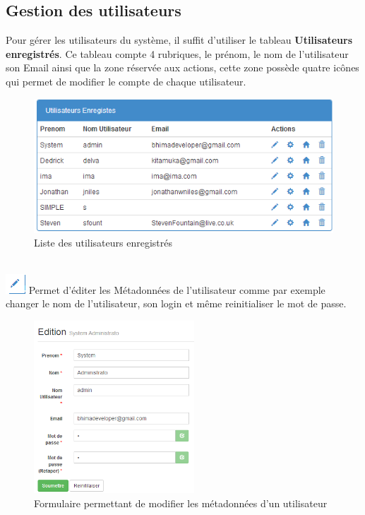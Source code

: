 \documentclass[12pt,a4paper]{report}
\begin{document}
\subsection{Gestion des utilisateurs}
Pour gérer les utilisateurs du système, il suffit d'utiliser le tableau \textbf{Utilisateurs enregistrés}. Ce tableau compte 4 rubriques, le prénom, le nom de l'utilisateur son Email ainsi que la zone réservée aux actions, cette zone possède quatre icônes qui permet de modifier le compte de chaque utilisateur.
\begin{figure}[h]
\begin{center}
\includegraphics[width=12cm]{pic/ListUser.png}
\end{center}
\caption{Liste des utilisateurs enregistrés}
\label{Liste des utilisateurs enregistrés}
\end{figure}
\\
 \includegraphics[scale=1]{pic/EditUser.png} Permet d'éditer les Métadonnées de l'utilisateur comme par exemple changer le nom de l'utilisateur, son login et même reinitialiser le mot de passe.
\\ 
 \begin{figure}[h]
\begin{center}
\includegraphics[width=6cm]{pic/UpdateUser.png}
\end{center}
\caption{Formulaire permettant de modifier les métadonnées d'un utilisateur}
\label{Formulaire permettant de modifier les métadonnées d'un utilisateur}
\end{figure}
\end{document}
